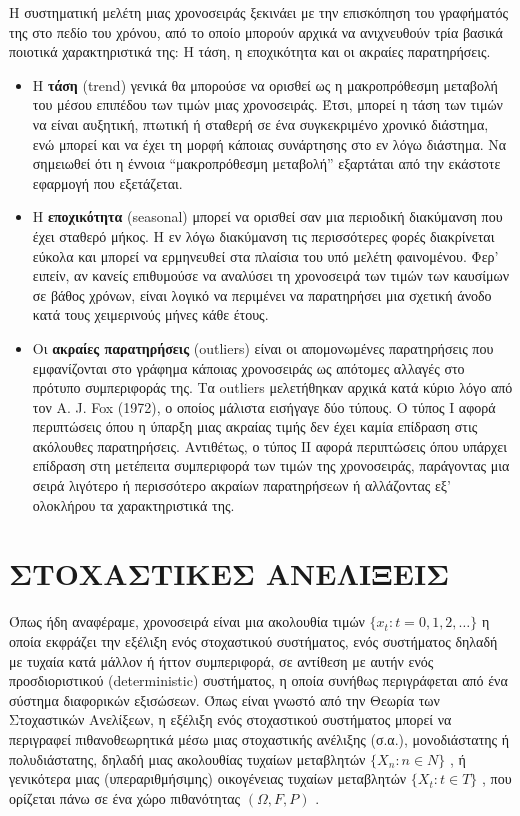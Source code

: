 Η συστηματική μελέτη μιας χρονοσειράς ξεκινάει με την επισκόπηση του
γραφήματός της στο πεδίο του χρόνου, από το οποίο μπορούν αρχικά να ανιχνευθούν
τρία βασικά ποιοτικά χαρακτηριστικά της: Η τάση, η εποχικότητα και οι ακραίες
παρατηρήσεις.\\
\begin{itemize}

\item Η \textbf{τάση} (trend) γενικά θα μπορούσε να ορισθεί ως η μακροπρόθεσμη μεταβολή του
μέσου επιπέδου των τιμών μιας χρονοσειράς. Έτσι, μπορεί η τάση των τιμών να είναι
αυξητική, πτωτική ή σταθερή σε ένα συγκεκριμένο χρονικό διάστημα, ενώ μπορεί και να
έχει τη μορφή κάποιας συνάρτησης στο εν λόγω διάστημα. Να σημειωθεί ότι η έννοια
“μακροπρόθεσμη μεταβολή” εξαρτάται από την εκάστοτε εφαρμογή που εξετάζεται.
\item Η \textbf{εποχικότητα} (seasonal) μπορεί να ορισθεί σαν μια περιοδική διακύμανση που έχει
σταθερό μήκος. Η εν λόγω διακύμανση τις περισσότερες φορές διακρίνεται εύκολα και
μπορεί να ερμηνευθεί στα πλαίσια του υπό μελέτη φαινομένου. Φερ' ειπείν, αν
κανείς επιθυμούσε να αναλύσει τη χρονοσειρά των τιμών των καυσίμων σε βάθος
χρόνων, είναι λογικό να περιμένει να παρατηρήσει μια σχετική άνοδο κατά τους
χειμερινούς μήνες κάθε έτους.

\item Οι \textbf{ακραίες παρατηρήσεις} (outliers) είναι οι απομονωμένες παρατηρήσεις που
εμφανίζονται στο γράφημα κάποιας χρονοσειράς ως απότομες αλλαγές στο πρότυπο
συμπεριφοράς της. Τα outliers μελετήθηκαν αρχικά κατά κύριο λόγο από τον A. J. Fox
(1972), ο οποίος μάλιστα εισήγαγε δύο τύπους. Ο τύπος I αφορά περιπτώσεις όπου η
ύπαρξη μιας ακραίας τιμής δεν έχει καμία επίδραση στις ακόλουθες παρατηρήσεις.
Αντιθέτως, ο τύπος ΙΙ αφορά περιπτώσεις όπου υπάρχει επίδραση στη μετέπειτα
συμπεριφορά των τιμών της χρονοσειράς, παράγοντας μια σειρά λιγότερο ή περισσότερο
ακραίων παρατηρήσεων ή αλλάζοντας εξ’ ολοκλήρου τα χαρακτηριστικά της.
\end{itemize}

\section{ΣΤΟΧΑΣΤΙΚΕΣ ΑΝΕΛΙΞΕΙΣ}
Όπως ήδη αναφέραμε, χρονοσειρά είναι μια ακολουθία τιμών
$\{ x_t : t = 0,1,2,\ldots\}$ η οποία εκφράζει την εξέλιξη ενός στοχαστικού συστήματος, ενός
συστήματος δηλαδή με τυχαία κατά μάλλον ή ήττον συμπεριφορά, σε αντίθεση με
αυτήν ενός προσδιοριστικού (deterministic) συστήματος, η οποία συνήθως
περιγράφεται από ένα σύστημα διαφορικών εξισώσεων. Όπως είναι γνωστό από την
Θεωρία των Στοχαστικών Ανελίξεων, η εξέλιξη ενός στοχαστικού συστήματος
μπορεί να περιγραφεί πιθανοθεωρητικά μέσω μιας στοχαστικής ανέλιξης (σ.α.),
μονοδιάστατης ή πολυδιάστατης, δηλαδή μιας ακολουθίας τυχαίων μεταβλητών
$\{X_n : n \in N \}$ , ή γενικότερα μιας (υπεραριθμήσιμης) οικογένειας τυχαίων
μεταβλητών $\{X_t : t \in T \}$ , που ορίζεται πάνω σε ένα χώρο πιθανότητας $\left(\Omega , F , P \right)$ .

